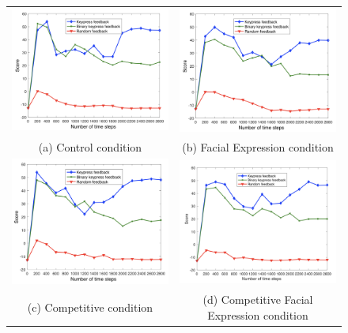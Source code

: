 \begin{figure}[htb]
\centering
\begin{tabular}{c c}
\includegraphics[width=0.45\columnwidth]{cond1} &
\includegraphics[width=0.45\columnwidth]{cond2} \\
(a) Control condition & (b) Facial Expression condition \\
\includegraphics[width=0.45\columnwidth]{cond3} &
\includegraphics[width=0.45\columnwidth]{cond4}\\
(c) Competitive condition & (d) Competitive Facial Expression condition

\end{tabular}
\end{figure}
